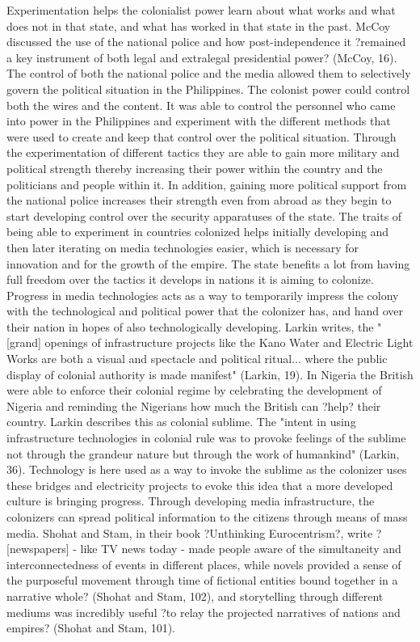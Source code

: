 \documentclass[12pt, oneside]{article}
\begin{document}
	Experimentation helps the colonialist power learn about what works and what does not in that state, and what has worked in that state in the past. McCoy discussed the use of the national police and how post-independence it ?remained a key instrument of both legal and extralegal presidential power? (McCoy, 16). The control of both the national police and the media allowed them to selectively govern the political situation in the Philippines. The colonist power could control both the wires and the content. It was able to control the personnel who came into power in the Philippines and experiment with the different methods that were used to create and keep that control over the political situation. Through the experimentation of different tactics they are able to gain more military and political strength thereby increasing their power within the country and the politicians and people within it. In addition, gaining more political support from the national police increases their strength even from abroad as they begin to start developing control over the security apparatuses of the state.
The traits of being able to experiment in countries colonized helps initially developing and then later iterating on media technologies easier, which is necessary for innovation and for the growth of the empire. The state benefits a lot from having full freedom over the tactics it develops in nations it is aiming to colonize.
Progress in media technologies acts as a way to temporarily impress the colony with the technological and political power that the colonizer has, and hand over their nation in hopes of also technologically developing. Larkin writes, the "[grand] openings of infrastructure projects like the Kano Water and Electric Light Works are both a visual and spectacle and political ritual... where the public display of colonial authority is made manifest" (Larkin, 19). In Nigeria the British were able to enforce their colonial regime by celebrating the development of Nigeria and reminding the Nigerians how much the British can ?help? their country. Larkin describes this as colonial sublime. The "intent in using infrastructure technologies in colonial rule was to provoke feelings of the sublime not through the grandeur nature but through the work of humankind" (Larkin, 36). Technology is here used as a way to invoke the sublime as the colonizer uses these bridges and electricity projects to evoke this idea that a more developed culture is bringing progress.
Through developing media infrastructure, the colonizers can spread political information to the citizens through means of mass media. Shohat and Stam, in their book ?Unthinking Eurocentrism?, write ?[newspapers] - like TV news today - made people aware of the simultaneity and interconnectedness of events in different places, while novels provided a sense of the purposeful movement through time of fictional entities bound together in a narrative whole? (Shohat and Stam, 102), and storytelling through different mediums was incredibly useful ?to relay the projected narratives of nations and empires? (Shohat and Stam, 101). 
\end{document}

